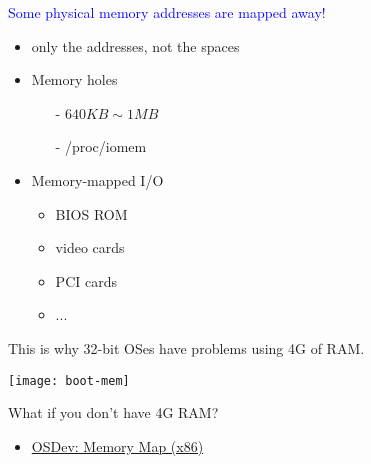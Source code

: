 \begin{frame}%
  \begin{varwidth}{.59\textwidth}
    \textcolor{blue}{Some physical memory addresses are mapped away!}
    \begin{itemize}
    \item only the addresses, not the spaces
    \item Memory holes
      \begin{itemize}
      \item[-] $640KB \sim 1MB$
      \item[-] /proc/iomem
      \end{itemize}
    \item Memory-mapped I/O
      \begin{itemize}
      \item BIOS ROM
      \item video cards
      \item PCI cards
      \item ...
      \end{itemize}
    \end{itemize}
    This is why 32-bit OSes have problems using 4G of RAM.
  \end{varwidth}\hfill
  \begin{varwidth}{.39\textwidth}
    \begin{center}
      \texttt{[image: boot-mem]}
    \end{center}
  \end{varwidth}
  \vspace{1em}
  \begin{center}
    What if you don't have 4G RAM?
  \end{center}
\end{frame}

\begin{itemize}
\item \href{http://wiki.osdev.org/Memory_Map_(x86)}{OSDev: Memory Map (x86)}
\end{itemize}

